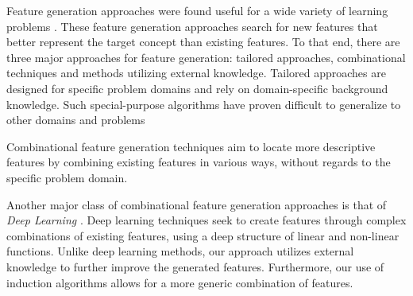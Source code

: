 \documentclass{article}
\theoremstyle{definition}
\begin{document}
Feature generation approaches were found useful for a wide variety of learning problems \citep{markovitch2002feature,ragavan1993complex}. %
These feature generation approaches search for new features that better represent the target concept than existing features. To that end, there are three major approaches for feature generation: tailored approaches, combinational techniques and methods utilizing external knowledge.
Tailored approaches \citep{hirsh1994bootstrapping} are designed for specific problem domains and rely on domain-specific background knowledge. %
Such special-purpose algorithms%
 have proven difficult to generalize to other domains and problems

Combinational feature generation techniques aim to locate more descriptive features by combining existing features in various ways, without regards to the specific problem domain. %

Another major class of combinational feature generation approaches is that of \emph{Deep Learning} \citep{plotz2011featurefull,kim2013deepfull}. Deep learning techniques seek to create features through complex combinations of existing features, using a deep structure of linear and non-linear functions.
Unlike deep learning methods, our approach utilizes external knowledge to further improve the generated features. Furthermore, our use of induction algorithms allows for a more generic combination of features.
\end{document}
